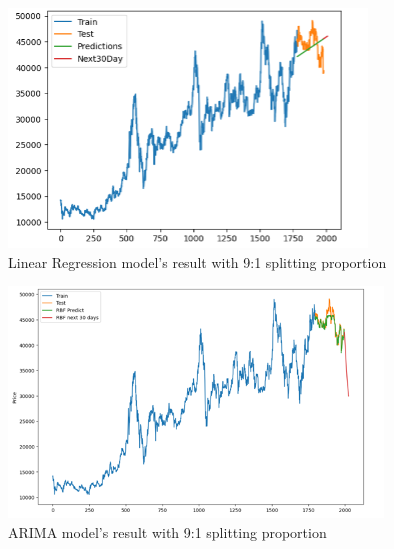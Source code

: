 \documentclass{ieeeojies}
\begin{document}
\begin{figure}[H]
  \centering
  \begin{minipage}{0.8\linewidth}
    \centering
    \includegraphics[width=\linewidth]{bibliography/LN_BIDV91.png}
    \caption{Linear Regression model's result with 9:1 splitting proportion}
    \label{fig22}
  \end{minipage}
\end{figure}
\begin{figure}[H]
  \centering
  \begin{minipage}{0.8\linewidth}
    \centering
    \includegraphics[width=\linewidth]{bibliography/SVR_BIDV91.png}
    \caption{ARIMA model's result with 9:1 splitting proportion}
    \label{fig23}
  \end{minipage}
\end{figure}
\end{document}
